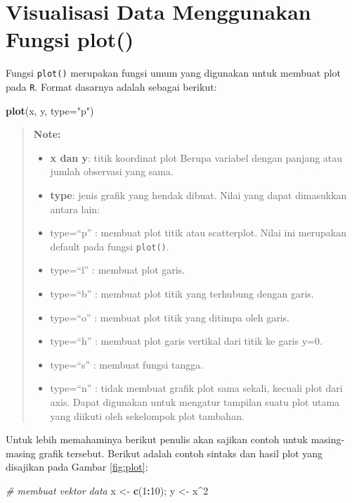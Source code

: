 \documentclass[]{book}
\newenvironment{Shaded}{\begin{snugshade}}{\end{snugshade}}
\newcommand{\KeywordTok}[1]{\textcolor[rgb]{0.13,0.29,0.53}{\textbf{#1}}}
\newcommand{\DataTypeTok}[1]{\textcolor[rgb]{0.13,0.29,0.53}{#1}}
\newcommand{\DecValTok}[1]{\textcolor[rgb]{0.00,0.00,0.81}{#1}}
\newcommand{\StringTok}[1]{\textcolor[rgb]{0.31,0.60,0.02}{#1}}
\newcommand{\CommentTok}[1]{\textcolor[rgb]{0.56,0.35,0.01}{\textit{#1}}}
\newcommand{\OperatorTok}[1]{\textcolor[rgb]{0.81,0.36,0.00}{\textbf{#1}}}
\newcommand{\NormalTok}[1]{#1}
\providecommand{\tightlist}{%
  \setlength{\itemsep}{0pt}\setlength{\parskip}{0pt}}
\begin{document}
\section{Visualisasi Data Menggunakan Fungsi
plot()}\label{visualisasi-data-menggunakan-fungsi-plot}

Fungsi \texttt{plot()} merupakan fungsi umum yang digunakan untuk
membuat plot pada \texttt{R}. Format dasarnya adalah sebagai berikut:

\begin{Shaded}
\begin{Highlighting}[]
\KeywordTok{plot}\NormalTok{(x, y, }\DataTypeTok{type=}\StringTok{"p"}\NormalTok{)}
\end{Highlighting}
\end{Shaded}

\begin{quote}
\textbf{Note: }

\begin{itemize}
\tightlist
\item
  \textbf{x dan y}: titik koordinat plot Berupa variabel dengan panjang
  atau jumlah observasi yang sama.
\item
  \textbf{type}: jenis grafik yang hendak dibuat. Nilai yang dapat
  dimasukkan antara lain:
\item
  type=``p'' : membuat plot titik atau scatterplot. Nilai ini merupakan
  default pada fungsi \texttt{plot()}.
\item
  type=``l'' : membuat plot garis.
\item
  type=``b'' : membuat plot titik yang terhubung dengan garis.
\item
  type=``o'' : membuat plot titik yang ditimpa oleh garis.
\item
  type=``h'' : membuat plot garis vertikal dari titik ke garis y=0.
\item
  type=``s'' : membuat fungsi tangga.
\item
  type=``n'' : tidak membuat grafik plot sama sekali, kecuali plot dari
  axis. Dapat digunakan untuk mengatur tampilan suatu plot utama yang
  diikuti oleh sekelompok plot tambahan.
\end{itemize}
\end{quote}

Untuk lebih memahaminya berikut penulis akan sajikan contoh untuk
masing-masing grafik tersebut. Berikut adalah contoh sintaks dan hasil
plot yang disajikan pada Gambar \ref{fig:plot}:

\begin{Shaded}
\begin{Highlighting}[]
\CommentTok{# membuat vektor data }
\NormalTok{x <-}\StringTok{ }\KeywordTok{c}\NormalTok{(}\DecValTok{1}\OperatorTok{:}\DecValTok{10}\NormalTok{); y <-}\StringTok{ }\NormalTok{x}\OperatorTok{^}\DecValTok{2}
\end{Highlighting}
\end{Shaded}
\end{document}
